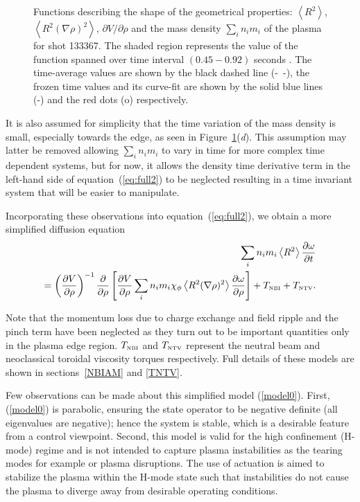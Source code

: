 \documentclass[12pt]{iopart}
\begin{document}
\begin{figure}
\begin{tabular}{cc}
\end{tabular}
\caption{Functions describing the shape of the geometrical properties: $\left< R^2 \right>$, $\left< R^2 (\nabla\rho)^2 \right>$, $\partial V/\partial \rho$ and  the mass density $ \sum_i n_i m_i $ of the plasma for shot 133367.  The shaded region represents the value of the function spanned over time interval $(0.45-0.92)$ seconds . The time-average values are shown by the black dashed line (-~-), the frozen time values and its curve-fit are shown by the solid blue lines (-) and the red dots (o) respectively.}
\label{fig:geofunc}
\end{figure}

It is also assumed for simplicity that the time variation of the mass density is small, especially towards the edge, as seen in Figure~{\ref{fig:geofunc}}(\emph{d}). 
 This assumption may latter be removed allowing $ \sum_i n_i m_i $  to vary in time for more complex time dependent systems, but for now, it allows the density time derivative term in the left-hand side of equation~(\ref{eq:full2}) to be neglected resulting in a time invariant system that will be easier to manipulate.
 
 Incorporating these observations into equation~(\ref{eq:full2}), we obtain a more simplified diffusion equation
\begin{eqnarray}
 \sum_i n_i m_i \left<R^2\right>
 \frac{\partial \omega}{\partial t} \nonumber \\
 = \left( \frac{\partial V}{\partial\rho}\right)^{-1}
   \frac{\partial}{\partial \rho} 
   \left[\frac{\partial V}{\partial \rho}\sum_i n_i m_i \chi_\phi 
   \left< R^2 (\nabla \rho)^2\right> 
   \frac{\partial\omega}{\partial\rho}\right] %
   + T_\textrm{\tiny NBI} + T_\textrm{\tiny NTV} .
\label{model0}
\end{eqnarray}

Note that the momentum loss due to charge exchange and field ripple and the pinch term have been neglected as they turn out to be important quantities only in the plasma edge region. $T_\textrm{\tiny NBI} $ and $T_\textrm{\tiny NTV}$ represent the neutral beam and neoclassical toroidal viscosity torques respectively. Full details of these models are shown in sections~\ref{NBIAM} and \ref{TNTV}.
  
Few observations can be made about this simplified model (\ref{model0}). First,  (\ref{model0}) is parabolic, ensuring the state operator to be negative definite (all eigenvalues are negative);  hence the system is stable, which is a desirable feature from a control viewpoint. 
Second, this model is valid for the high confinement (H-mode) regime and is not intended to capture plasma instabilities as the tearing modes for example or plasma disruptions. The use of actuation is aimed to stabilize the plasma within the H-mode state such that instabilities do not cause the plasma to diverge away from desirable operating conditions.
  
\end{document}
